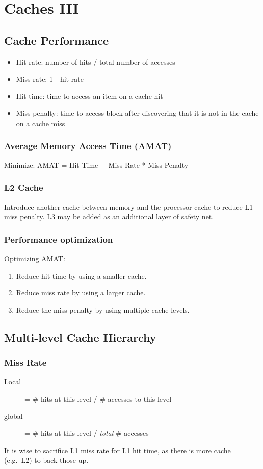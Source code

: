 \chapter{Caches III}

\section{Cache Performance}
\begin{itemize}
    \item Hit rate: number of hits / total number of accesses
    \item Miss rate: 1 - hit rate
    \item Hit time: time to access an item on a cache hit
    \item Miss penalty: time to access block after discovering that it is not in the cache on a cache miss
\end{itemize}

\subsection{Average Memory Access Time (AMAT)}
Minimize: AMAT = Hit Time + Miss Rate * Miss Penalty

\subsection{L2 Cache}
Introduce another cache between memory and the processor cache to reduce L1 miss penalty. L3 may be added as an additional layer of safety net.

\subsection{Performance optimization}
Optimizing AMAT:
\begin{enumerate}
	\item Reduce hit time by using a smaller cache.
	\item Reduce miss rate by using a larger cache.
	\item Reduce the miss penalty by using multiple cache levels.
\end{enumerate}

\section{Multi-level Cache Hierarchy}
\subsection{Miss Rate}
\begin{description}
	\item[Local] = \# hits at this level / \# accesses to this level
	\item[global] = \# hits at this level / \emph{total} \# accesses
\end{description}
It is wise to sacrifice L1 miss rate for L1 hit time, as there is more cache (e.g.~L2) to back those up.

